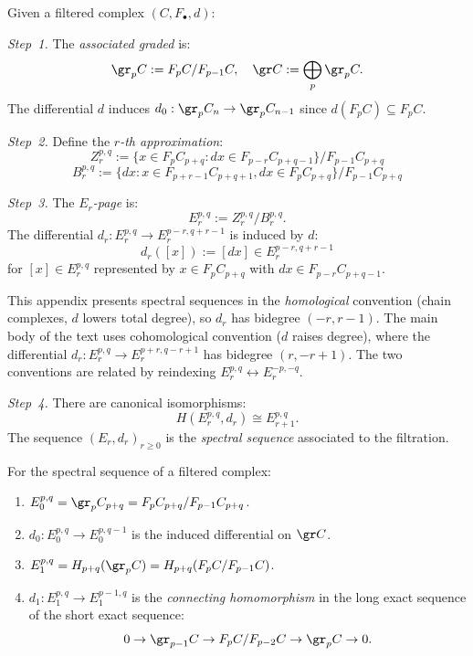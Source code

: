 \begin{construction}
\label{constr:ass-graded-ss}
Given a filtered complex $(C, F_\bullet, d)$:

\emph{Step~1.} The \emph{associated graded} is:
\[
\gr_p C := F_p C / F_{p-1} C, \quad \gr C := \bigoplus_p \gr_p C.
\]
The differential $d$ induces $d_0: \gr_p C_n \to \gr_p C_{n-1}$ since
$d(F_p C) \subseteq F_p C$.

\emph{Step~2.} Define the \emph{$r$-th approximation}:
\[
Z_r^{p,q} := \{x \in F_p C_{p+q} : dx \in F_{p-r} C_{p+q-1}\} / F_{p-1} C_{p+q}
\]
\[
B_r^{p,q} := \{dx : x \in F_{p+r-1} C_{p+q+1}, dx \in F_p C_{p+q}\} / F_{p-1} C_{p+q}
\]

\emph{Step~3.} The \emph{$E_r$-page} is:
\[
E_r^{p,q} := Z_r^{p,q} / B_r^{p,q}.
\]
The differential $d_r: E_r^{p,q} \to E_r^{p-r, q+r-1}$ is induced by $d$:
\[
d_r([x]) := [dx] \in E_r^{p-r, q+r-1}
\]
for $[x] \in E_r^{p,q}$ represented by $x \in F_p C_{p+q}$ with $dx \in F_{p-r} C_{p+q-1}$.

\begin{remark}[Convention]
This appendix presents spectral sequences in the \emph{homological} convention (chain complexes, $d$ lowers total degree), so $d_r$ has bidegree $(-r, r-1)$. The main body of the text uses cohomological convention ($d$ raises degree), where the differential $d_r: E_r^{p,q} \to E_r^{p+r, q-r+1}$ has bidegree $(r, -r+1)$. The two conventions are related by reindexing $E_r^{p,q} \leftrightarrow E_r^{-p,-q}$.
\end{remark}

\emph{Step~4.} There are canonical isomorphisms:
\[
H(E_r^{p,q}, d_r) \cong E_{r+1}^{p,q}.
\]
The sequence $(E_r, d_r)_{r \geq 0}$ is the \emph{spectral sequence} associated
to the filtration.
\end{construction}

\begin{theorem}
\label{thm:early-pages}
For the spectral sequence of a filtered complex:
\begin{enumerate}[label=(\roman*)]
\item $E_0^{p,q} = \gr_p C_{p+q} = F_p C_{p+q} / F_{p-1} C_{p+q}$.
\item $d_0: E_0^{p,q} \to E_0^{p, q-1}$ is the induced differential on $\gr C$.
\item $E_1^{p,q} = H_{p+q}(\gr_p C) = H_{p+q}(F_p C / F_{p-1} C)$.
\item $d_1: E_1^{p,q} \to E_1^{p-1, q}$ is the \emph{connecting homomorphism}
in the long exact sequence of the short exact sequence:
\[
0 \to \gr_{p-1} C \to F_p C / F_{p-2} C \to \gr_p C \to 0.
\]
\end{enumerate}
\end{theorem}

